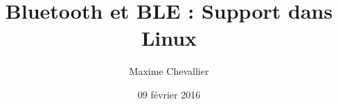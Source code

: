 \documentclass{beamer}
\title[BT, BLE, BlueZ]{Bluetooth et BLE : Support dans Linux}
\author{Maxime Chevallier}
\date{09 février 2016}
\institute{Open Wide Ingénierie}
\begin{document}
    \begin{frame}

	\titlepage

    \end{frame}






\end{document}
